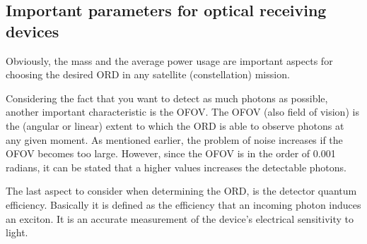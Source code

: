 \subsection{Important parameters for optical receiving devices}
	\label{blDOparametersORD}
Obviously, the mass and the average power usage are important aspects for choosing the desired \acs{ORD} in any satellite (constellation) mission. 

Considering the fact that you want to detect as much photons as possible, another important characteristic is the \ac{OFOV}. The \acs{OFOV} (also field of vision) is the (angular or linear) extent to which the \acs{ORD} is able to observe photons at any given moment. As mentioned earlier, the problem of noise increases if the \acs{OFOV} becomes too large. However, since the \acs{OFOV} is in the order of 0.001 radians, it can be stated that a higher values increases the detectable photons.

The last aspect to consider when determining the \acs{ORD}, is the detector quantum efficiency. Basically it is defined as the efficiency that an incoming photon induces an exciton. It is an accurate measurement of the device's electrical sensitivity to light. 